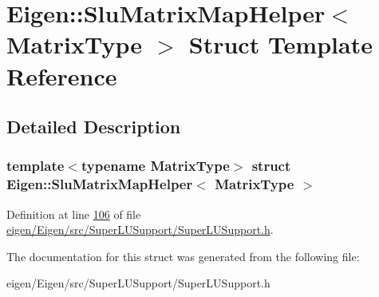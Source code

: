 \hypertarget{struct_eigen_1_1_slu_matrix_map_helper}{}\section{Eigen\+:\+:Slu\+Matrix\+Map\+Helper$<$ Matrix\+Type $>$ Struct Template Reference}
\label{struct_eigen_1_1_slu_matrix_map_helper}


\subsection{Detailed Description}
\subsubsection*{template$<$typename Matrix\+Type$>$\newline
struct Eigen\+::\+Slu\+Matrix\+Map\+Helper$<$ Matrix\+Type $>$}



Definition at line \hyperlink{eigen_2_eigen_2src_2_super_l_u_support_2_super_l_u_support_8h_source_l00106}{106} of file \hyperlink{eigen_2_eigen_2src_2_super_l_u_support_2_super_l_u_support_8h_source}{eigen/\+Eigen/src/\+Super\+L\+U\+Support/\+Super\+L\+U\+Support.\+h}.



The documentation for this struct was generated from the following file\+:\begin{DoxyCompactItemize}
\item 
eigen/\+Eigen/src/\+Super\+L\+U\+Support/\+Super\+L\+U\+Support.\+h\end{DoxyCompactItemize}
